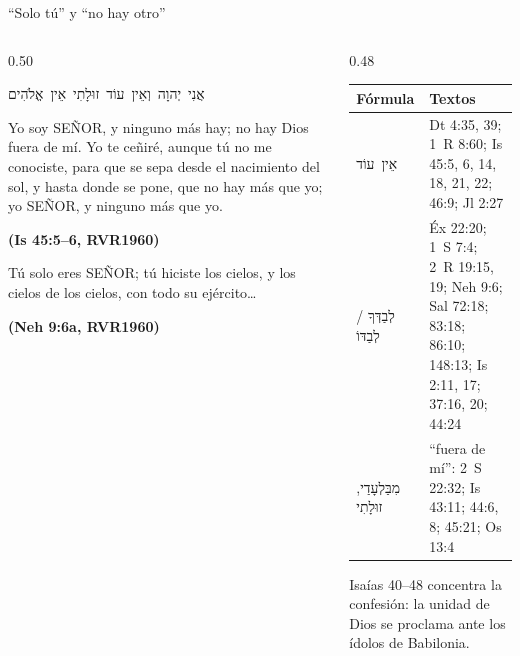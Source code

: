 \documentclass[hyperref={bookmarks=false},aspectratio=169]{beamer}
\newcommand{\heb}[1]{\mbox{\foreignlanguage{hebrew}{#1}}}
\newcommand{\SENOR}{S{\fontsize{0.78em}{1em}\selectfont EÑOR}}
\newcommand{\fuente}[1]{\par\hfill{\upshape\bfseries\footnotesize\textcolor{azul}{#1}}}
\begin{document}
\begin{frame}{``Solo tú'' y ``no hay otro''}
\begin{columns}[t,onlytextwidth]
\begin{column}{0.50\textwidth}
\begin{center}\small\heb{אֲנִי יְהוָה וְאֵין עוֹד זוּלָתִי אֵין אֱלֹהִים}\end{center}
\begin{cita}[fontupper=\scriptsize\itshape]Yo soy \SENOR, y ninguno más hay; no hay Dios fuera de mí. Yo te ceñiré, aunque tú no me conociste, para que se sepa desde el nacimiento del sol, y hasta donde se pone, que no hay más que yo; yo \SENOR, y ninguno más que yo.\fuente{(Is 45:5--6, RVR1960)}\end{cita}
\begin{cita}[fontupper=\scriptsize\itshape]Tú solo eres \SENOR; tú hiciste los cielos, y los cielos de los cielos, con todo su ejército\ldots{}\fuente{(Neh 9:6a, RVR1960)}\end{cita}
\end{column}
\begin{column}{0.48\textwidth}
\scriptsize\renewcommand{\arraystretch}{1.12}
\begin{tabular}{@{}>{\RaggedRight\arraybackslash}p{1.8cm}>{\RaggedRight\arraybackslash}p{3.6cm}@{}}
\toprule
\textbf{Fórmula} & \textbf{Textos} \\ \midrule
\heb{אֵין עוֹד} & Dt 4:35, 39; 1~R 8:60; Is 45:5, 6, 14, 18, 21, 22; 46:9; Jl 2:27 \\
\heb{לְבַדְּךָ} / \heb{לְבַדּוֹ} & Éx 22:20; 1~S 7:4; 2~R 19:15, 19; Neh 9:6; Sal 72:18; 83:18; 86:10; 148:13; Is 2:11, 17; 37:16, 20; 44:24 \\
\heb{מִבַּלְעָדַי}, \heb{זוּלָתִי} & ``fuera de mí'': 2~S 22:32; Is 43:11; 44:6, 8; 45:21; Os 13:4 \\
\bottomrule
\end{tabular}\par\smallskip
\small Isaías 40--48 concentra la confesión: la unidad de Dios se proclama ante los ídolos de Babilonia.
\end{column}
\end{columns}
\end{frame}
\end{document}
